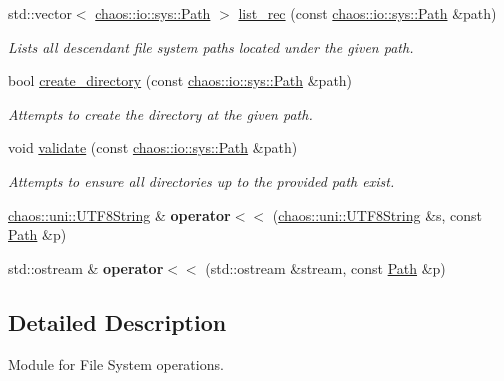 \begin{DoxyCompactItemize}
std\+::vector$<$ \hyperlink{classchaos_1_1io_1_1sys_1_1_path}{chaos\+::io\+::sys\+::\+Path} $>$ \hyperlink{namespacechaos_1_1io_1_1sys_a956856df76f476b3300ab1ebe733e2a7}{list\+\_\+rec} (const \hyperlink{classchaos_1_1io_1_1sys_1_1_path}{chaos\+::io\+::sys\+::\+Path} \&path)
\begin{DoxyCompactList}\small\item\em Lists all descendant file system paths located under the given path. \end{DoxyCompactList}\item 
bool \hyperlink{namespacechaos_1_1io_1_1sys_a6bcdadf916b110395f4a2627c049da11}{create\+\_\+directory} (const \hyperlink{classchaos_1_1io_1_1sys_1_1_path}{chaos\+::io\+::sys\+::\+Path} \&path)
\begin{DoxyCompactList}\small\item\em Attempts to create the directory at the given path. \end{DoxyCompactList}\item 
void \hyperlink{namespacechaos_1_1io_1_1sys_a15e20b105c40cf4d73b13afe87ce1781}{validate} (const \hyperlink{classchaos_1_1io_1_1sys_1_1_path}{chaos\+::io\+::sys\+::\+Path} \&path)
\begin{DoxyCompactList}\small\item\em Attempts to ensure all directories up to the provided path exist. \end{DoxyCompactList}\item 
\hypertarget{namespacechaos_1_1io_1_1sys_a669178b3843d1716570b4b5ca8fd417d}{}\hyperlink{classchaos_1_1uni_1_1_u_t_f8_string}{chaos\+::uni\+::\+U\+T\+F8\+String} \& {\bfseries operator$<$$<$} (\hyperlink{classchaos_1_1uni_1_1_u_t_f8_string}{chaos\+::uni\+::\+U\+T\+F8\+String} \&s, const \hyperlink{classchaos_1_1io_1_1sys_1_1_path}{Path} \&p)\label{namespacechaos_1_1io_1_1sys_a669178b3843d1716570b4b5ca8fd417d}

\item 
\hypertarget{namespacechaos_1_1io_1_1sys_aa28fa69e8966c0ff55c3b59cdff9cebc}{}std\+::ostream \& {\bfseries operator$<$$<$} (std\+::ostream \&stream, const \hyperlink{classchaos_1_1io_1_1sys_1_1_path}{Path} \&p)\label{namespacechaos_1_1io_1_1sys_aa28fa69e8966c0ff55c3b59cdff9cebc}

\end{DoxyCompactItemize}


\subsection{Detailed Description}
Module for File System operations. 

